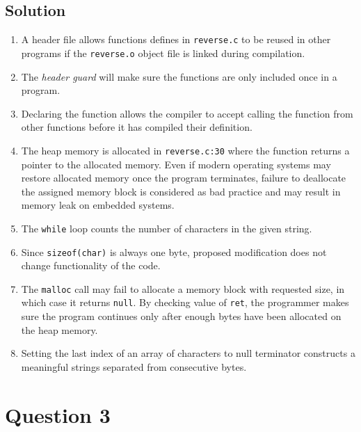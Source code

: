 \documentclass[12pt,letterpaper,twoside]{article}
\begin{document}
\subsection*{Solution}

\begin{enumerate}
\item
A header file allows functions defines in \texttt{reverse.c} to be reused in other programs if the \texttt{reverse.o} object file is linked during compilation.

\item
The \textit{header guard} will make sure the functions are only included once in a program.

\item
Declaring the function allows the compiler to accept calling the function from other functions before it has compiled their definition.

\item
The heap memory is allocated in \texttt{reverse.c:30} where the function returns a pointer to the allocated memory.
Even if modern operating systems may restore allocated memory once the program terminates, failure to deallocate the assigned memory block is considered as bad practice and may result in memory leak on embedded systems.

\item
The \texttt{while} loop counts the number of characters in the given string.

\item
Since \texttt{sizeof(char)} is always one byte, proposed modification does not change functionality of the code.

\item
The \texttt{malloc} call may fail to allocate a memory block with requested size, in which case it returns \texttt{null}.
By checking value of \texttt{ret}, the programmer makes sure the program continues only after enough bytes have been allocated on the heap memory.

\item
Setting the last index of an array of characters to null terminator constructs a meaningful strings separated from consecutive bytes.

\end{enumerate}

\section*{Question 3}
\end{document}
